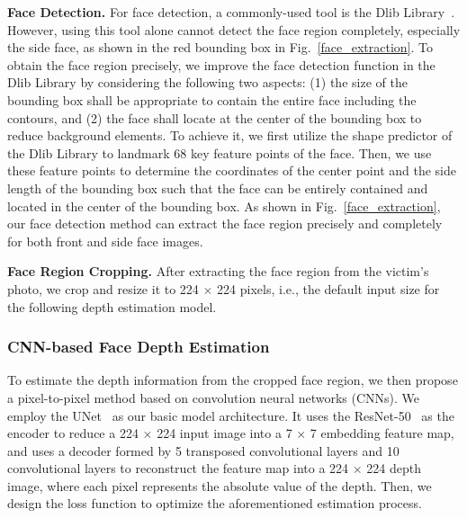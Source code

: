 \textbf{Face Detection.} For face detection, a commonly-used tool is the Dlib Library~\cite{dlib09}. However, using this tool alone cannot detect the face region completely, especially the side face, as shown in the red bounding box in Fig.~\ref{face_extraction}.
To obtain the face region precisely, we improve the face detection function in the Dlib Library by considering the following two aspects: (1) the size of the bounding box shall be appropriate to contain the entire face including the contours, and (2) the face shall  locate at the center of the bounding box to reduce background elements. To achieve it, we first utilize the shape predictor of the Dlib Library to landmark 68 key feature points of the face. Then, we use these feature points to determine the coordinates of the center point and the side length of the bounding box such that the face can be entirely contained and located in the center of the bounding box. 
As shown in Fig.~\ref{face_extraction},  our face detection method can extract the face region precisely and completely for both front and side face images.

\textbf{Face Region Cropping.} 
After extracting the face region from the victim's photo, we crop and resize it to 224 $\times$ 224 pixels, i.e., the default input size for the following depth estimation model.

\subsubsection{CNN-based Face Depth Estimation}
To estimate the depth information from the cropped face region, we then propose a pixel-to-pixel method based on convolution neural networks (CNNs). We employ the UNet~\cite{ronneberger2015u} as our basic model architecture. It uses the  ResNet-50~\cite{he2016deep} as the encoder to reduce a 224 $\times$ 224 input image into a 7 $\times$ 7 embedding feature map, and uses a decoder formed by 5 transposed convolutional layers and 10 convolutional layers to reconstruct the feature map into a 224 $\times$ 224 depth image, where each pixel represents the absolute value of the depth.  Then, we design the loss function to optimize the aforementioned estimation process.



